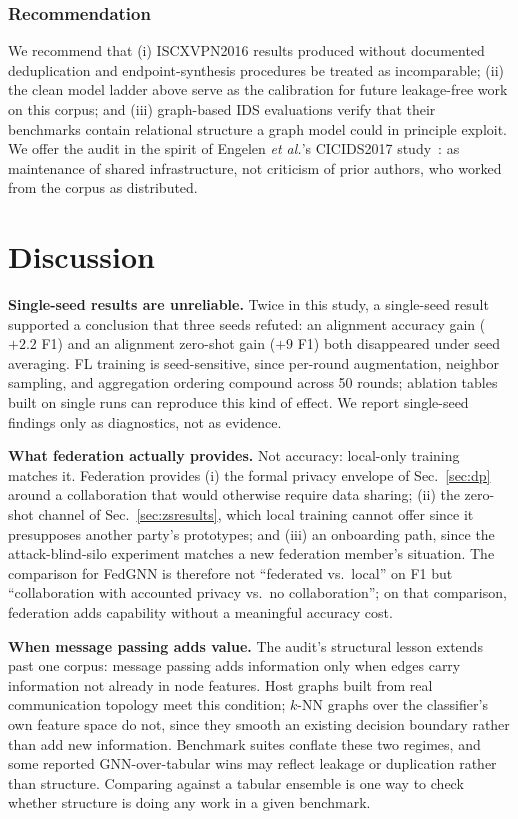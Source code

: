 \documentclass[journal]{IEEEtran}
\begin{document}
\subsubsection{Recommendation}
We recommend that (i) ISCXVPN2016 results produced without documented
deduplication and endpoint-synthesis procedures be treated as
incomparable; (ii) the clean model ladder above serve as the
calibration for future leakage-free work on this corpus; and (iii)
graph-based IDS evaluations verify that their benchmarks contain
relational structure a graph model could in principle exploit. We
offer the audit in the spirit of Engelen \emph{et al.}'s CICIDS2017
study~\cite{engelen}: as maintenance of shared
infrastructure, not criticism of prior authors, who worked from the
corpus as distributed.

\section{Discussion}
\label{sec:discussion}

\textbf{Single-seed results are unreliable.} Twice in this study, a
single-seed result supported a conclusion that three seeds refuted: an
alignment accuracy gain ($+2.2$ F1) and an alignment zero-shot gain
($+9$ F1) both disappeared under seed averaging. FL training is
seed-sensitive, since per-round augmentation, neighbor sampling, and
aggregation ordering compound across 50 rounds; ablation tables built
on single runs can reproduce this kind of effect. We report
single-seed findings only as diagnostics, not as evidence.

\textbf{What federation actually provides.} Not accuracy: local-only
training matches it. Federation provides (i) the formal privacy
envelope of Sec.~\ref{sec:dp} around a collaboration that would
otherwise require data sharing; (ii) the zero-shot channel of
Sec.~\ref{sec:zsresults}, which local training cannot offer since it
presupposes another party's prototypes; and (iii) an onboarding
path, since the attack-blind-silo experiment matches a new federation
member's situation. The comparison for FedGNN is therefore not
``federated vs.\ local'' on F1 but ``collaboration with accounted
privacy vs.\ no collaboration''; on that comparison, federation adds
capability without a meaningful accuracy cost.

\textbf{When message passing adds value.} The audit's structural
lesson extends past one corpus: message passing adds information only
when edges carry information not already in node features. Host
graphs built from real communication topology meet this condition;
$k$-NN graphs over the classifier's own feature space do not, since
they smooth an existing decision boundary rather than add new
information. Benchmark suites conflate these two regimes, and some
reported GNN-over-tabular wins may reflect leakage or duplication
rather than structure. Comparing against a tabular ensemble is one way
to check whether structure is doing any work in a given benchmark.
\end{document}
